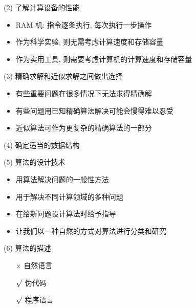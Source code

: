 \documentclass[fontset=fandol,UTF8,12pt,aspectratio=169,fleqn]{beamer}
\begin{document}
\begin{frame}{(2) 了解计算设备的性能}
\begin{itemize}[<+-|alert@+>]
\item RAM 机: 指令逐条执行, 每次执行一步操作  
\item 作为科学实验, 则无需考虑计算速度和存储容量 
\item 作为实用工具, 则需要考虑计算机的计算速度和存储容量  
\end{itemize}
\end{frame}

\begin{frame}{(3) 精确求解和近似求解之间做出选择}
\begin{itemize}[<+-|alert@+>]
\item 有些重要问题在很多情况下无法求得精确解   
\item 有些问题用已知精确算法解决可能会慢得难以忍受   
\item 近似算法可作为更复杂的精确算法的一部分   
\end{itemize}
\end{frame}

\begin{frame}{(4) 确定适当的数据结构}
\end{frame}

\begin{frame}{(5) 算法的设计技术}
\begin{itemize}[<+-|alert@+>]
\item 用算法解决问题的一般性方法  
\item 用于解决不同计算领域的多种问题  
\item 在给新问题设计算法时给予指导  
\item 让我们以一种自然的方式对算法进行分类和研究  
\end{itemize}
\end{frame}

\begin{frame}{(6) 算法的描述}
\begin{itemize}[<+-|alert@+>]
\item[$\times$] 自然语言
\item[$\surd$] 伪代码
\item[$\surd$] 程序语言
\end{itemize}
\end{frame}
\end{document}
